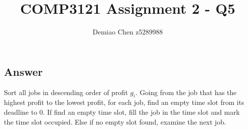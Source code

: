 \documentclass[12pt]{article}
\title{COMP3121 Assignment 2 - Q5}
\author{Demiao Chen z5289988}
\begin{document}
\maketitle
{}




\subsection*{Answer}
Sort all jobs in descending order of profit $g_i$. Going from the job that has the highest profit
to the lowest profit, for each job, find an empty time slot from its deadline to 0. If find an empty 
time slot, fill the job 
in the time slot and mark the time slot occupied. Else if no empty slot found, examine the next job.
\end{document}
